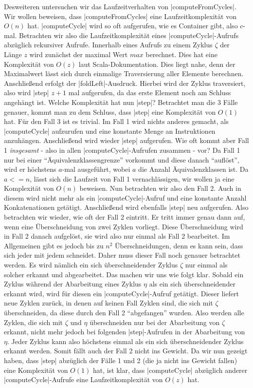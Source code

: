 Desweiteren untersuchen wir das Laufzeitverhalten von |computeFromCycles|. Wir wollen beweisen, dass |computeFromCycles| eine Laufzeitkomplexität von $O(n)$ hat.
|computeCycle| wird so oft aufgerufen, wie es Container gibt, also $c$-mal.
Betrachten wir also die Laufzeitkomplexität eines |computeCycle|-Aufrufs abzüglich rekursiver Aufrufe.
Innerhalb eines Aufrufs zu einem Zyklus $\zeta$ der Länge $z$ wird zunächst der maximal Wert $max$ berechnet.
Dies hat eine Komplexität von $O(z)$ laut Scala-Dokumentation. Dies liegt nahe, denn der Maximalwert lässt sich durch einmalige Traversierung aller Elemente berechnen.
Anschließend erfolgt der |foldLeft|-Ausdruck. Hierbei wird der Zyklus traversiert, also wird |step| $z+1$ mal aufgerufen, da das erste Element noch am Schluss angehängt ist.
Welche Komplexität hat nun |step|? Betrachtet man die 3 Fälle genauer, kommt man zu dem Schluss, dass |step| eine Komplexität von $O(1)$ hat.
Für den Fall 3 ist es trivial. Im Fall 1 wird nichts anderes gemacht, als |computeCycle| aufzurufen und eine konstante Menge an Instruktionen anzuhängen.
Anschließend wird wieder |step| aufgerufen. Wie oft kommt aber Fall 1 \emph{insgesamt} - also in allen |computeCycle|-Aufrufen zusammen - vor?
Da Fall 1 nur bei einer ``Äquivalenzklassengrenze'' vorkommt und diese danach ``auflöst'', wird er höchstens $a$-mal ausgeführt, wobei $a$ die Anzahl Äquivalenzklassen ist.
Da $a <= n$, lässt sich die Laufzeit von Fall 1 vernachlässigen, wir wollen ja eine Komplexität von $O(n)$ beweisen.
Nun betrachten wir also den Fall 2. Auch in diesem wird nicht mehr als ein |computeCycle|-Aufruf und eine konstante Anzahl Konkatenationen getätigt.
Anschließend wird ebenfalls |step| neu aufgerufen. Also betrachten wir wieder, wie oft der Fall 2 eintritt.
Er tritt immer genau dann auf, wenn eine Überschneidung von zwei Zyklen vorliegt. Diese Überschneidung wird in Fall 2 danach aufgelöst, sie wird also nur einmal als Fall 2 bearbeitet.
Im Allgemeinen gibt es jedoch bis zu $n^2$ Überschneidungen, denn es kann sein, dass sich jeder mit jedem schneidet. Daher muss dieser Fall noch genauer betrachtet werden.
Es wird nämlich ein sich überschneidender Zyklus $\zeta$ nur einmal als solcher erkannt und abgearbeitet. Das machen wir uns wie folgt klar.
Sobald ein Zyklus während der Abarbeitung eines Zyklus $\eta$ als ein sich überschneidender erkannt wird, wird für diesen ein |computeCycle|-Aufruf getätigt.
Dieser liefert neue Zyklen zurück, in denen auf keinen Fall Zyklen sind, die sich mit $\zeta$ überschneiden, da diese durch den Fall 2 ``abgefangen'' wurden.
Also werden alle Zyklen, die sich mit $\zeta$ und $\eta$ überschneiden nur bei der Abarbeitung von $\zeta$ erkannt, nicht mehr jedoch bei folgenden |step|-Aufrufen
in der Abarbeitung von $\eta$. Jeder Zyklus kann also höchstens einmal als ein sich überschneidender Zyklus erkannt werden. Somit fällt auch der Fall 2 nicht ins Gewicht.
Da wir nun gezeigt haben, dass |step| abzüglich der Fälle 1 und 2 (die ja nicht ins Gewicht fallen) eine Komplexität von $O(1)$ hat, ist klar, dass
|computeCycle| abzüglich anderer |computeCycle|-Aufrufe eine Laufzeitkomplexität von $O(z)$ hat.

